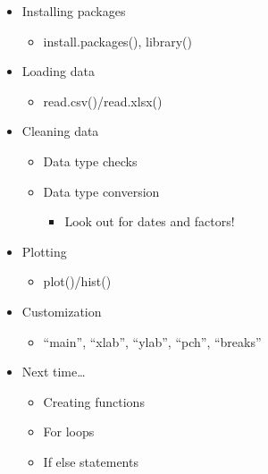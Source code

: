 \documentclass[]{article}
\providecommand{\tightlist}{%
  \setlength{\itemsep}{0pt}\setlength{\parskip}{0pt}}
\begin{document}
\begin{itemize}
\tightlist
\item
  Installing packages

  \begin{itemize}
  \tightlist
  \item
    install.packages(), library()
  \end{itemize}
\item
  Loading data

  \begin{itemize}
  \tightlist
  \item
    read.csv()/read.xlsx()
  \end{itemize}
\item
  Cleaning data

  \begin{itemize}
  \tightlist
  \item
    Data type checks
  \item
    Data type conversion

    \begin{itemize}
    \tightlist
    \item
      Look out for dates and factors!
    \end{itemize}
  \end{itemize}
\item
  Plotting

  \begin{itemize}
  \tightlist
  \item
    plot()/hist()
  \end{itemize}
\item
  Customization

  \begin{itemize}
  \tightlist
  \item
    ``main'', ``xlab'', ``ylab'', ``pch'', ``breaks''
  \end{itemize}
\item
  Next time\ldots{}

  \begin{itemize}
  \tightlist
  \item
    Creating functions
  \item
    For loops
  \item
    If else statements
  \end{itemize}
\end{itemize}
\end{document}
